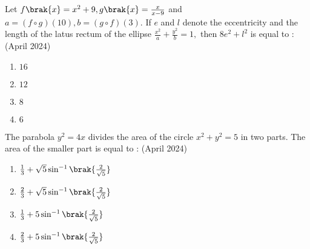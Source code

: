     \item Let $f\brak{x}=x^2+9, g\brak{x}= \frac{x}{x-9}$ and $a=(f \circ g)(10), b= (g \circ f)(3).$ If $e$ and $l$ denote the eccentricity and the length of the latus rectum of the ellipse $\frac{x^2}{a} + \frac{y^2}{b} = 1,$ then $8e^2 + l^2$ is equal to :
    \hfill(April 2024)
    \begin{enumerate}
        \item $16$
        \item $12$
        \item $8$
        \item $6$ \\
    \end{enumerate}


    \item The parabola $y^2=4x$ divides the area of the circle $x^2+y^2=5$ in two parts. The area of the smaller part is equal to :
    \hfill(April 2024)
    \begin{enumerate}
        \item $\frac{1}{3} + \sqrt{5} \sin^{-1} \brak{\frac{2}{\sqrt{5}}}$
        \item $\frac{2}{3} + \sqrt{5} \sin^{-1} \brak{\frac{2}{\sqrt{5}}}$
        \item $\frac{1}{3} + 5 \sin^{-1} \brak{\frac{2}{\sqrt{5}}}$
        \item $\frac{2}{3} + 5 \sin^{-1} \brak{\frac{2}{\sqrt{5}}}$\\
    \end{enumerate}

  


